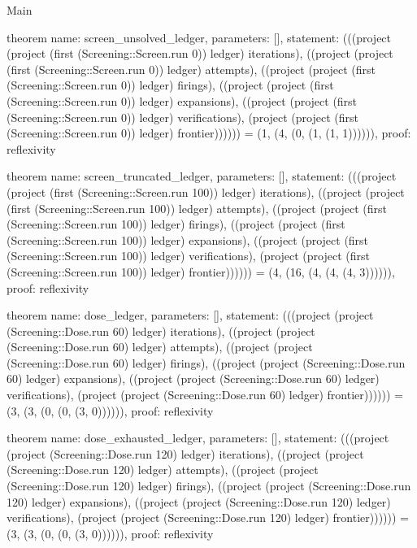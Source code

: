 \begin{lexlean}{Main}
\begin{semanticmodule}
theorem{
  name: screen_unsolved_ledger,
  parameters: [],
  statement: (((project (project (first (Screening::Screen.run 0)) ledger) iterations), ((project (project (first (Screening::Screen.run 0)) ledger) attempts), ((project (project (first (Screening::Screen.run 0)) ledger) firings), ((project (project (first (Screening::Screen.run 0)) ledger) expansions), ((project (project (first (Screening::Screen.run 0)) ledger) verifications), (project (project (first (Screening::Screen.run 0)) ledger) frontier)))))) = (1, (4, (0, (1, (1, 1)))))),
  proof: reflexivity{}
}

theorem{
  name: screen_truncated_ledger,
  parameters: [],
  statement: (((project (project (first (Screening::Screen.run 100)) ledger) iterations), ((project (project (first (Screening::Screen.run 100)) ledger) attempts), ((project (project (first (Screening::Screen.run 100)) ledger) firings), ((project (project (first (Screening::Screen.run 100)) ledger) expansions), ((project (project (first (Screening::Screen.run 100)) ledger) verifications), (project (project (first (Screening::Screen.run 100)) ledger) frontier)))))) = (4, (16, (4, (4, (4, 3)))))),
  proof: reflexivity{}
}

theorem{
  name: dose_ledger,
  parameters: [],
  statement: (((project (project (Screening::Dose.run 60) ledger) iterations), ((project (project (Screening::Dose.run 60) ledger) attempts), ((project (project (Screening::Dose.run 60) ledger) firings), ((project (project (Screening::Dose.run 60) ledger) expansions), ((project (project (Screening::Dose.run 60) ledger) verifications), (project (project (Screening::Dose.run 60) ledger) frontier)))))) = (3, (3, (0, (0, (3, 0)))))),
  proof: reflexivity{}
}

theorem{
  name: dose_exhausted_ledger,
  parameters: [],
  statement: (((project (project (Screening::Dose.run 120) ledger) iterations), ((project (project (Screening::Dose.run 120) ledger) attempts), ((project (project (Screening::Dose.run 120) ledger) firings), ((project (project (Screening::Dose.run 120) ledger) expansions), ((project (project (Screening::Dose.run 120) ledger) verifications), (project (project (Screening::Dose.run 120) ledger) frontier)))))) = (3, (3, (0, (0, (3, 0)))))),
  proof: reflexivity{}
}
\end{semanticmodule}
\end{lexlean}
